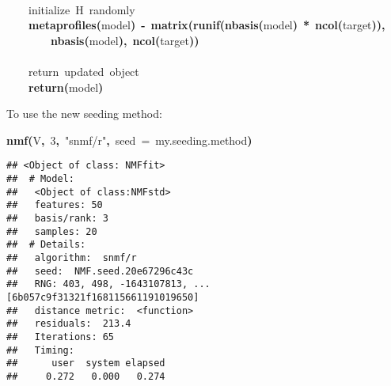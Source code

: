 \documentclass[a4paper]{article}\usepackage{graphicx, color}
\makeatletter
\newcommand{\hlnumber}[1]{\textcolor[rgb]{0,0,0}{#1}}%
\newcommand{\hlfunctioncall}[1]{\textcolor[rgb]{0.501960784313725,0,0.329411764705882}{\textbf{#1}}}%
\newcommand{\hlstring}[1]{\textcolor[rgb]{0.6,0.6,1}{#1}}%
\newcommand{\hlkeyword}[1]{\textcolor[rgb]{0,0,0}{\textbf{#1}}}%
\newcommand{\hlargument}[1]{\textcolor[rgb]{0.690196078431373,0.250980392156863,0.0196078431372549}{#1}}%
\newcommand{\hlcomment}[1]{\textcolor[rgb]{0.180392156862745,0.6,0.341176470588235}{#1}}%
\newcommand{\hlassignement}[1]{\textcolor[rgb]{0,0,0}{\textbf{#1}}}%
\newcommand{\hlsymbol}[1]{\textcolor[rgb]{0,0,0}{#1}}%
\newcommand{\hlstd}[1]{\textcolor[rgb]{0,0,0}{#1}}%
\newenvironment{kframe}{%
 \def\FrameCommand##1{\hskip\@totalleftmargin \hskip-\fboxsep
 \colorbox{shadecolor}{##1}\hskip-\fboxsep
     \hskip-\linewidth \hskip-\@totalleftmargin \hskip\columnwidth}%
 \MakeFramed {\advance\hsize-\width
   \@totalleftmargin\z@ \linewidth\hsize
   \@setminipage}}%
 {\par\unskip\endMakeFramed}
\newenvironment{knitrout}{}{} %
\makeatother
\begin{document}
\begin{knitrout}
\begin{kframe}
\begin{flushleft}
\hlstd{}\hspace*{\fill}\\
\hlstd{}{\ }{\ }{\ }{\ }\hlcomment{\usebox{\hlnormalsizeboxhash}{\ }initialize{\ }H{\ }randomly}\hspace*{\fill}\\
\hlstd{}{\ }{\ }{\ }{\ }\hlfunctioncall{metaprofiles}\hlkeyword{(}\hlsymbol{model}\hlkeyword{)}{\ }\hlassignement{\usebox{\hlnormalsizeboxlessthan}-}{\ }\hlfunctioncall{matrix}\hlkeyword{(}\hlfunctioncall{runif}\hlkeyword{(}\hlfunctioncall{nbasis}\hlkeyword{(}\hlsymbol{model}\hlkeyword{)}{\ }\hlkeyword{*}{\ }\hlfunctioncall{ncol}\hlkeyword{(}\hlsymbol{target}\hlkeyword{)}\hlkeyword{)}\hlkeyword{,}\hspace*{\fill}\\
\hlstd{}{\ }{\ }{\ }{\ }{\ }{\ }{\ }{\ }\hlfunctioncall{nbasis}\hlkeyword{(}\hlsymbol{model}\hlkeyword{)}\hlkeyword{,}{\ }\hlfunctioncall{ncol}\hlkeyword{(}\hlsymbol{target}\hlkeyword{)}\hlkeyword{)}\hspace*{\fill}\\
\hlstd{}\hspace*{\fill}\\
\hlstd{}{\ }{\ }{\ }{\ }\hlcomment{\usebox{\hlnormalsizeboxhash}{\ }return{\ }updated{\ }object}\hspace*{\fill}\\
\hlstd{}{\ }{\ }{\ }{\ }\hlfunctioncall{return}\hlkeyword{(}\hlsymbol{model}\hlkeyword{)}\hspace*{\fill}\\
\hlstd{}\hlkeyword{\usebox{\hlnormalsizeboxclosebrace}}\mbox{}
\normalfont
\end{flushleft}
\end{kframe}
\end{knitrout}


To use the new seeding method:
\begin{knitrout}
\color{fgcolor}\begin{kframe}
\begin{flushleft}
\ttfamily\noindent
\hlfunctioncall{nmf}\hlkeyword{(}\hlsymbol{V}\hlkeyword{,}{\ }\hlnumber{3}\hlkeyword{,}{\ }\hlstring{"{}snmf/r"{}}\hlkeyword{,}{\ }\hlargument{seed}{\ }\hlargument{=}{\ }\hlsymbol{my.seeding.method}\hlkeyword{)}\mbox{}
\normalfont
\end{flushleft}
\begin{verbatim}
## <Object of class: NMFfit>
##  # Model:
##   <Object of class:NMFstd>
##   features: 50 
##   basis/rank: 3 
##   samples: 20 
##  # Details:
##   algorithm:  snmf/r 
##   seed:  NMF.seed.20e67296c43c 
##   RNG: 403, 498, -1643107813, ... [6b057c9f31321f168115661191019650]
##   distance metric:  <function> 
##   residuals:  213.4 
##   Iterations: 65 
##   Timing:
##      user  system elapsed 
##     0.272   0.000   0.274 
\end{verbatim}
\end{kframe}
\end{knitrout}
\end{document}
